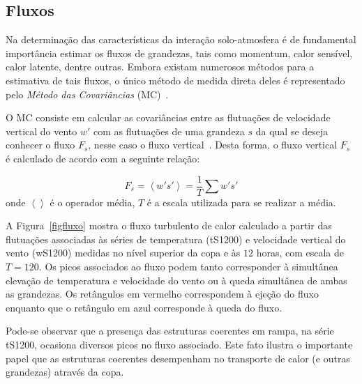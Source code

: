 \subsection{Fluxos}

Na determinação das características da interação solo-atmosfera é de fundamental importância estimar os fluxos de grandezas, tais como momentum, calor sensível, calor latente, dentre outras. Embora existam numerosos métodos para a estimativa de tais fluxos, o único método de medida direta deles é representado pelo \textit{Método das Covariâncias} (MC)~\cite{arya/88}. 

O MC consiste em calcular as covariâncias entre as flutuações de velocidade vertical do vento $w'$ com as flutuações de uma grandeza $s$ da qual se deseja conhecer o fluxo $F_{s}$, nesse caso o fluxo vertical~\cite{arya/88}. Desta forma, o fluxo vertical $F_{s}$ é calculado de acordo com a seguinte relação:

\begin{equation}
F_{s}=\left<w's'\right>=\frac{1}{T}\sum w's'
\label{eqfluxo}
\end{equation}
onde $\left<\right>$ é o operador média, $T$ é a escala utilizada para se realizar a média.

A Figura~\ref{figfluxo} mostra o fluxo turbulento de calor calculado a partir das flutuações associadas às séries de temperatura (tS1200) e velocidade vertical do vento (wS1200) medidas no nível superior da copa e às $12$ horas, com escala de $T=120$. Os picos associados ao fluxo podem tanto corresponder à simultânea elevação de temperatura e velocidade do vento ou à queda simultânea de ambas as grandezas. Os retângulos em vermelho correspondem à ejeção do fluxo enquanto que o retângulo em azul corresponde à queda do fluxo.

Pode-se observar que a presença das estruturas coerentes em rampa, na série tS1200, ocasiona diversos picos no fluxo associado. Este fato ilustra o importante papel que as estruturas coerentes desempenham no transporte de calor (e outras grandezas) através da copa. %

